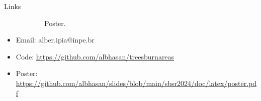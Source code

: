 \documentclass[20pt]{beamer}
\begin{document}
\begin{frame}[fragile,t]
\begin{columns}[t]
\begin{column}{0.33\linewidth}
\begin{block}{Links}
\begin{figure}
\begin{subfigure}[b]{0.2\textwidth}
\centering
{Poster.}
    \end{subfigure}
\end{figure}
\vspace{0.7cm}
    \begin{itemize}
        \item Email: alber.ipia@inpe.br
        \item Code: {\small\url{https://github.com/albhasan/treesburnareas}}
        \item Poster: {\small\url{https://github.com/albhasan/slides/blob/main/sbsr2024/doc/latex/poster.pdf}}
    \end{itemize}
    \end{block}
\end{column}


\end{columns}
\end{frame}
\end{document}
